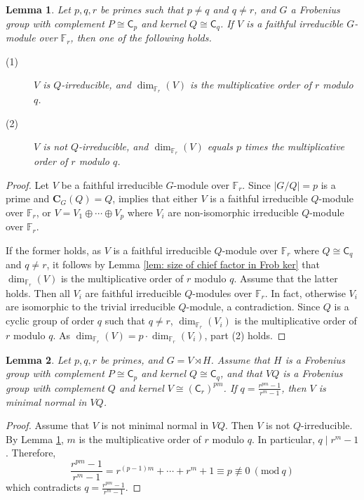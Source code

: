 \documentclass[9pt]{article}
\newtheorem{lem}{\bf Lemma}[section]
\begin{document}
\begin{lem}\label{lem: dim of faithful module}
	Let $p,q,r$ be primes such that $p\neq q$ and $q\neq r$, 
	and 
	$G$ a Frobenius group with complement $P\cong \mathsf{C}_{p}$ and kernel $Q\cong \mathsf{C}_{q}$.
	If $V$ is a faithful irreducible $G$-module over $\mathbb{F}_r$, then one of the following holds.
	\begin{description}
		\item[(1)] $V$ is $Q$-irreducible, and $\dim_{\mathbb{F}_r}(V)$ is the multiplicative order of $r$ modulo $q$.
		\item[(2)] $V$ is not $Q$-irreducible, and $\dim_{\mathbb{F}_r}(V)$ equals $p$ times the multiplicative order of $r$ modulo $q$. 
	\end{description}
\end{lem}
\begin{proof}
	Let $V$ be a faithful irreducible $G$-module over $\mathbb{F}_r$.
	Since $|G/Q|=p$ is a prime and $\mathbf{C}_{G}(Q)=Q$,
	\cite[Theorem 0.1, Lemma 2.2]{manzwolf1992}
	implies that either $V$ is a faithful irreducible $Q$-module
	over $\mathbb{F}_r$, or $V=V_1\oplus  \cdots \oplus  V_p$ where $V_i$ are non-isomorphic irreducible $Q$-module
	over $\mathbb{F}_r$.



	
	If the former holds, as $V$ is a faithful irreducible $Q$-module over $\mathbb{F}_r$ where $Q\cong \mathsf{C}_{q}$ and $q\neq r$,
	it follows by Lemma \ref{lem: size of chief factor in Frob ker} that $\dim_{\mathbb{F}_r}(V)$ is the multiplicative order of $r$ modulo $q$.
    Assume that the latter holds.
	Then all $V_i$ are faithful irreducible $Q$-modules over $\mathbb{F}_r$.
	In fact, otherwise $V_i$ are isomorphic to the trivial irreducible $Q$-module, a contradiction.
	Since $Q$ is a cyclic group of order $q$ such that $q\neq r$, $\dim_{\mathbb{F}_r}(V_i)$ is the multiplicative order of $r$ modulo $q$.
    As $\dim_{\mathbb{F}_r}(V)=p\cdot \dim_{\mathbb{F}_r}(V_i)$, part (2) holds.
\end{proof}





\begin{lem}\label{lem: 2-Frobenius}
	Let $p,q,r$ be primes, and $G=V \rtimes H$.
	Assume that  
	$H$ is a Frobenius group with complement $P\cong \mathsf{C}_{p}$ and kernel $Q\cong \mathsf{C}_{q}$,
	and that $VQ$ is a Frobenius group with complement $Q$ and kernel $V\cong (\mathsf{C}_{r})^{pm}$.
    If $q=\frac{r^{pm}-1}{r^{m}-1}$,
	then $V$ is minimal normal in $VQ$.	
\end{lem}
\begin{proof}
	Assume that $V$ is not minimal normal in $VQ$.
	Then $V$ is not $Q$-irreducible.
	By Lemma \ref{lem: dim of faithful module}, $m$ is the multiplicative order of $r$ modulo $q$.
	In particular, $q\mid r^{m}-1$.
	Therefore,
	\[
	 \frac{r^{pm}-1}{r^{m}-1}=r^{(p-1)m}+\cdots +r^{m}+1 \equiv p \nequiv 0~(\mathrm{mod}~q)
	\]
	which contradicts $q=\frac{r^{pm}-1}{r^{m}-1}$.
\end{proof}
\end{document}
